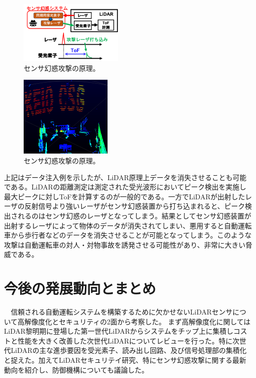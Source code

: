 \documentclass[twocolumn, 11pt, a4j]{article}
\begin{document}
 \begin{figure}[!t]
\centering
 \includegraphics[width=0.45\textwidth]{figs/spoof1.png}
  \caption{センサ幻惑攻撃の原理。}
\label{spoof_logic}
\end{figure}

 \begin{figure}[!t]
\centering
 \includegraphics[width=0.4\textwidth]{figs/spoofing_keio.png}
  \caption{センサ幻惑攻撃の原理。}
\label{spoof_keio}
\end{figure}

上記はデータ注入例を示したが、LiDAR原理上データを消失させることも可能である。LiDARの距離測定は測定された受光波形においてピーク検出を実施し最大ピークに対しToFを計算するのが一般的である。一方でLiDARが出射したレーザの反射信号より強いレーザがセンサ幻惑装置から打ち込まれると、ピーク検出されるのはセンサ幻惑のレーザとなってしまう。結果としてセンサ幻惑装置が出射するレーザによって物体のデータが消失されてしまい、悪用すると自動運転車から歩行者などのデータを消失させることが可能となってしまう\cite{cao2022you}。このような攻撃は自動運転車の対人・対物事故を誘発させる可能性があり、非常に大きい脅威である。

\section{今後の発展動向とまとめ}
　信頼される自動運転システムを構築するために欠かせないLiDARセンサについて高解像度化とセキュリティの2面から考察した。
まず高解像度化に関してはLiDAR黎明期に登場した第一世代LiDARからシステムをチップ上に集積しコストと性能を大きく改善した次世代LiDARについてレビューを行った。特に次世代LiDARの主な進歩要因を受光素子、読み出し回路、及び信号処理部の集積化と捉えた。加えてLiDARセキュリテイ研究、特にセンサ幻惑攻撃に関する最新動向を紹介し、防御機構についても議論した。
\end{document}
